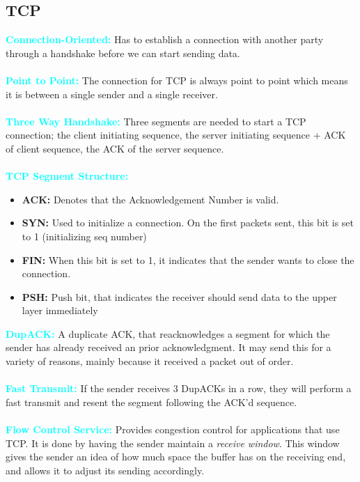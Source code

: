 \documentclass[]{article}
\begin{document}
\subsection{TCP}
\textcolor{Cyan}{\textbf{Connection-Oriented:}} Has to establish a connection with another party through a handshake before we can start sending data. \\\\
\textcolor{Cyan}{\textbf{Point to Point:}} The connection for TCP is always point to point which means it is between a single sender and a single receiver. \\\\
\textcolor{Cyan}{\textbf{Three Way Handshake:}} Three segments are needed to start a TCP connection; the client initiating sequence, the server initiating sequence + ACK of client sequence, the ACK of the server sequence. \\\\
\textcolor{Cyan}{\textbf{TCP Segment Structure:}}
\begin{itemize}
	\item \textbf{ACK:} Denotes that the Acknowledgement Number is valid. 
	\item \textbf{SYN:} Used to initialize a connection. On the first packets sent, this bit is set to 1 (initializing seq number) 
	\item \textbf{FIN:} When this bit is set to 1, it indicates that the sender wants to close the connection. 
	\item \textbf{PSH:} Push bit, that indicates the receiver should send data to the upper layer immediately
\end{itemize}
\textcolor{Cyan}{\textbf{DupACK:}} A duplicate ACK, that reacknowledges a segment for which the sender has already received an prior acknowledgment. It may send this for a variety of reasons, mainly because it received a packet out of order. \\\\
\textcolor{Cyan}{\textbf{Fast Transmit:}} If the sender receives 3 DupACKs in a row, they will perform a fast transmit and resent the segment following the ACK'd sequence. \\\\
\textcolor{Cyan}{\textbf{Flow Control Service:}} Provides congestion control for applications that use TCP. It is done by having the sender maintain a \textit{receive window}. This window gives the sender an idea of how much space the buffer has on the receiving end, and allows it to adjust its sending accordingly. \\\\
\end{document}

